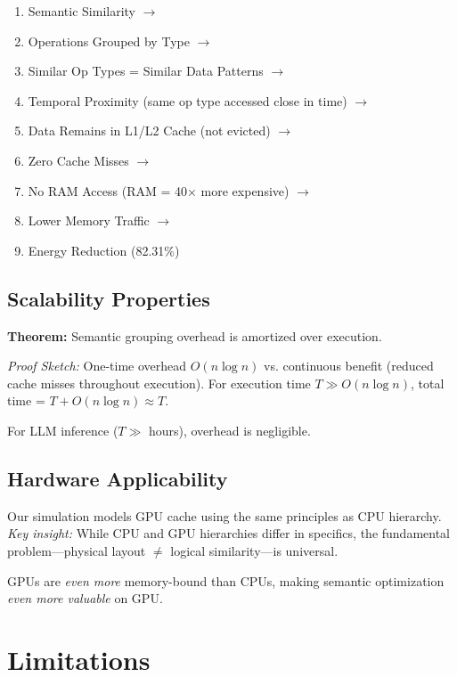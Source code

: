 \documentclass[11pt,twocolumn]{article}
\begin{document}
\begin{enumerate}
\item Semantic Similarity $\rightarrow$
\item Operations Grouped by Type $\rightarrow$
\item Similar Op Types = Similar Data Patterns $\rightarrow$
\item Temporal Proximity (same op type accessed close in time) $\rightarrow$
\item Data Remains in L1/L2 Cache (not evicted) $\rightarrow$
\item Zero Cache Misses $\rightarrow$
\item No RAM Access (RAM = 40× more expensive) $\rightarrow$
\item Lower Memory Traffic $\rightarrow$
\item Energy Reduction (82.31\%)
\end{enumerate}

\subsection{Scalability Properties}

\textbf{Theorem:} Semantic grouping overhead is amortized over execution.

\textit{Proof Sketch:} One-time overhead $O(n \log n)$ vs. continuous benefit (reduced cache misses throughout execution). For execution time $T \gg O(n \log n)$, total time = $T + O(n \log n) \approx T$.

For LLM inference ($T \gg$ hours), overhead is negligible.

\subsection{Hardware Applicability}

Our simulation models GPU cache using the same principles as CPU hierarchy. \textit{Key insight:} While CPU and GPU hierarchies differ in specifics, the fundamental problem---physical layout $\neq$ logical similarity---is universal.

GPUs are \textit{even more} memory-bound than CPUs, making semantic optimization \textit{even more valuable} on GPU.

\section{Limitations}
\end{document}
